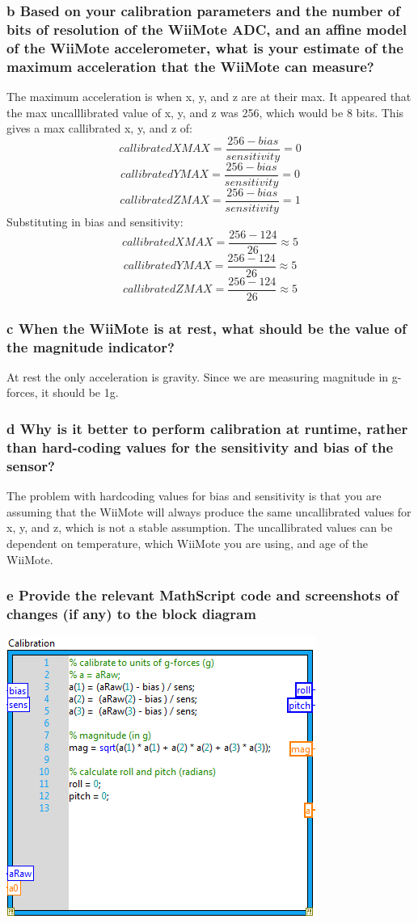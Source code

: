 \documentclass[10pt,a4paper]{article}
\begin{document}
    \subsubsection*{b Based on your calibration parameters and the number of bits of resolution of the WiiMote ADC, and an affine model of the WiiMote accelerometer, what is your estimate of the maximum acceleration that the WiiMote can measure?}
      The maximum acceleration is when x, y, and z are at their max. It appeared that the max uncalllibrated value of x, y, and z was 256, which would be 8 bits. This gives a max callibrated x, y, and z of:
        \[callibratedXMAX = \frac{256 - bias}{sensitivity} = 0\] 
        \[callibratedYMAX = \frac{256 - bias}{sensitivity} = 0\] 
        \[callibratedZMAX = \frac{256 - bias}{sensitivity} = 1\]
      Substituting in bias and sensitivity:
        \[callibratedXMAX = \frac{256 - 124}{26} \approx 5\] 
        \[callibratedYMAX = \frac{256 - 124}{26} \approx 5\] 
        \[callibratedZMAX = \frac{256 - 124}{26} \approx 5\]
    \subsubsection*{c When the WiiMote is at rest, what should be the value of the magnitude indicator?}
      At rest the only acceleration is gravity. Since we are measuring magnitude in g-forces, it should be 1g. 
    \subsubsection*{d Why is it better to perform calibration at runtime, rather than hard-coding values for the sensitivity and bias of the sensor?}
      The problem with hardcoding values for bias and sensitivity is that you are assuming that the WiiMote will always produce the same uncallibrated values for x, y, and z, which is not a stable assumption. The uncallibrated values can be dependent on temperature, which WiiMote you are using, and age of the WiiMote. 
    \subsubsection*{e Provide the relevant MathScript code and screenshots of changes (if any) to the block diagram}
    \includegraphics{../lab1_data/lab1_6e.PNG} 
\end{document}
